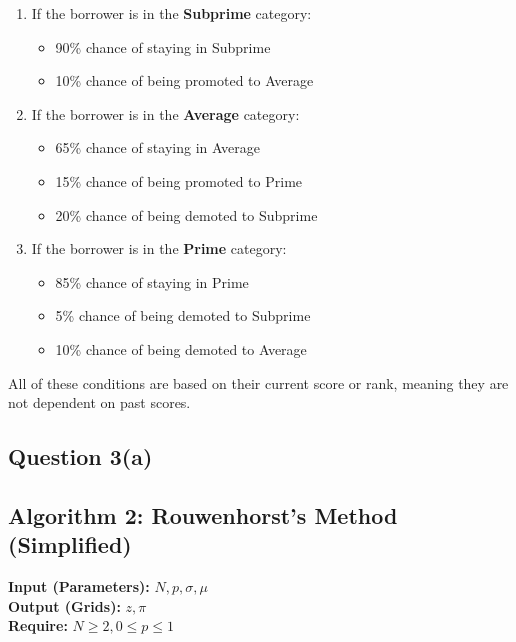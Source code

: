 \documentclass{article}
\begin{document}
\begin{enumerate}
    \item If the borrower is in the \textbf{Subprime} category:
    \begin{itemize}
        \item 90\% chance of staying in Subprime
        \item 10\% chance of being promoted to Average
    \end{itemize}
    
    \item If the borrower is in the \textbf{Average} category:
    \begin{itemize}
        \item 65\% chance of staying in Average
        \item 15\% chance of being promoted to Prime
        \item 20\% chance of being demoted to Subprime
    \end{itemize}
    
    \item If the borrower is in the \textbf{Prime} category:
    \begin{itemize}
        \item 85\% chance of staying in Prime
        \item 5\% chance of being demoted to Subprime
        \item 10\% chance of being demoted to Average
    \end{itemize}
\end{enumerate}

All of these conditions are based on their current score or rank, meaning they are not dependent on past scores.

\subsection*{Question 3(a)}
\subsection*{Algorithm 2: Rouwenhorst's Method (Simplified)}

\textbf{Input (Parameters):} $N, p, \sigma, \mu$ \\
\textbf{Output (Grids):} $z, \pi$ \\

\textbf{Require:} $N \geq 2, 0 \leq p \leq 1$
\end{document}
